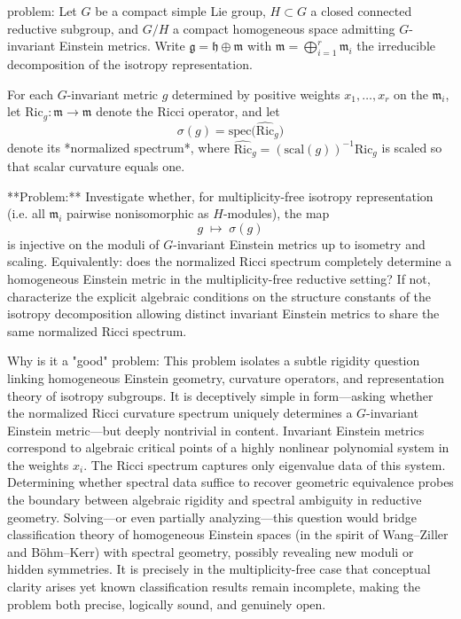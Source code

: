problem:  
Let \( G \) be a compact simple Lie group, \( H \subset G \) a closed connected reductive subgroup, and \( G/H \) a compact homogeneous space admitting \( G \)-invariant Einstein metrics. Write \( \mathfrak{g} = \mathfrak{h} \oplus \mathfrak{m} \) with \(\mathfrak{m} = \bigoplus_{i=1}^r \mathfrak{m}_i\) the irreducible decomposition of the isotropy representation.  

For each \( G \)-invariant metric \(g\) determined by positive weights \( x_1, \dots, x_r \) on the \( \mathfrak{m}_i\), let \( \mathrm{Ric}_g:\mathfrak{m}\to\mathfrak{m} \) denote the Ricci operator, and let  
\[
\sigma(g) = \text{spec}\big(\widehat{\mathrm{Ric}}_g\big)
\]
denote its *normalized spectrum*, where \( \widehat{\mathrm{Ric}}_g = (\mathrm{scal}(g))^{-1}\mathrm{Ric}_g \) is scaled so that scalar curvature equals one.  

**Problem:**  
Investigate whether, for multiplicity-free isotropy representation (i.e. all \(\mathfrak{m}_i\) pairwise nonisomorphic as \(H\)-modules), the map  
\[
g \;\mapsto\; \sigma(g)
\]
is injective on the moduli of \( G \)-invariant Einstein metrics up to isometry and scaling.  
Equivalently: does the normalized Ricci spectrum completely determine a homogeneous Einstein metric in the multiplicity-free reductive setting?  
If not, characterize the explicit algebraic conditions on the structure constants of the isotropy decomposition allowing distinct invariant Einstein metrics to share the same normalized Ricci spectrum.

Why is it a "good" problem:  
This problem isolates a subtle rigidity question linking homogeneous Einstein geometry, curvature operators, and representation theory of isotropy subgroups. It is deceptively simple in form—asking whether the normalized Ricci curvature spectrum uniquely determines a \(G\)-invariant Einstein metric—but deeply nontrivial in content. Invariant Einstein metrics correspond to algebraic critical points of a highly nonlinear polynomial system in the weights \(x_i\). The Ricci spectrum captures only eigenvalue data of this system. Determining whether spectral data suffice to recover geometric equivalence probes the boundary between algebraic rigidity and spectral ambiguity in reductive geometry.  
Solving—or even partially analyzing—this question would bridge classification theory of homogeneous Einstein spaces (in the spirit of Wang–Ziller and Böhm–Kerr) with spectral geometry, possibly revealing new moduli or hidden symmetries. It is precisely in the multiplicity-free case that conceptual clarity arises yet known classification results remain incomplete, making the problem both precise, logically sound, and genuinely open.